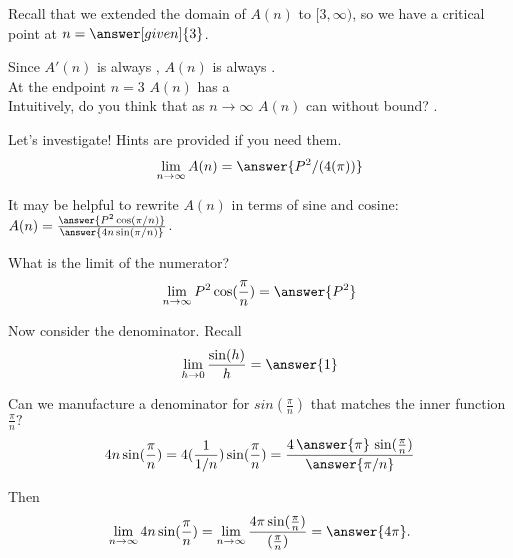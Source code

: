 \documentclass[handout,nooutcomes]{ximera}
\begin{document}
\bigskip

\begin{problem}
Recall that we extended the domain of $A(n)$ to $[3,\infty)$, so we have a critical point at $n= \answer[given]{3}$.
\end{problem}

\bigskip

\begin{problem}
Since $A'(n)$ is always , $A(n)$ is always .\\
\smallskip
At the endpoint $n=3$ $A(n)$ has a \\
\smallskip
Intuitively, do you think that as $n \to \infty$ $A(n)$ can  without bound? .\\ %
\end{problem}

\medskip

\begin{problem}
Let's investigate! Hints are provided if you need them.\\
\[\lim_{n \to \infty}A(n) = \answer{P^2/(4(\pi))}\]
\begin{hint}
	It may be helpful to rewrite $A(n)$ in terms of sine and cosine:\\ $A(n) = \frac{ \answer{P^2\cos(\pi/n)} }{ \answer{4n\sin(\pi/n)} }$.
\end{hint}
\begin{hint}
    What is the limit of the numerator? \[\lim_{n \to \infty} P^2\cos(\frac{\pi}{n}) = \answer{P^2}\]
\end{hint}
\begin{hint}
  Now consider the denominator. Recall \[\lim_{h \to 0} \frac{\sin(h)}{h} = \answer{1}\]
\end{hint}
\begin{hint}
  Can we manufacture a denominator for $sin(\frac{\pi}{n})$ that matches the inner function $\frac{\pi}{n}?$\\
  \[4n\sin(\frac{\pi}{n}) = 4(\frac{1}{1/n})\sin(\frac{\pi}{n}) = \frac{4\,\answer{\pi}\,\sin(\frac{\pi}{n})}{\answer{\pi/n}}\]
\end{hint}
\begin{hint}
     Then \[\lim_{n \to \infty} 4n\sin(\frac{\pi}{n}) = \lim_{n \to \infty} \frac{4\pi\sin(\frac{\pi}{n})}{(\frac{\pi}{n})} = \answer{4\pi}.\]
\end{hint}
\end{problem}
\end{document}
